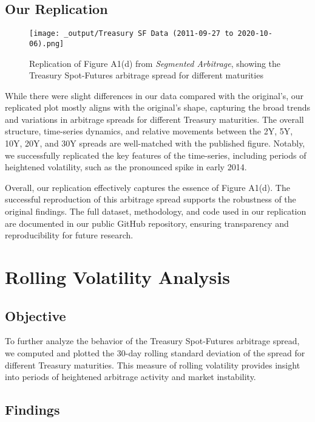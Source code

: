 \documentclass{article}
\begin{document}
\subsection{Our Replication}

\begin{figure}[h]
  \centering
  \texttt{[image: \_output/Treasury SF Data (2011-09-27 to 2020-10-06).png]}
  \caption{Replication of Figure A1(d) from \textit{Segmented Arbitrage}, showing the Treasury Spot-Futures arbitrage spread for different maturities}
  \label{fig:treasury_spot_futures_replication}
\end{figure}




While there were slight differences in our data compared with the original's, our replicated plot mostly aligns with the original's shape, capturing the broad trends and variations in arbitrage spreads for different Treasury maturities. The overall structure, time-series dynamics, and relative movements between the 2Y, 5Y, 10Y, 20Y, and 30Y spreads are well-matched with the published figure. Notably, we successfully replicated the key features of the time-series, including periods of heightened volatility, such as the pronounced spike in early 2014.

Overall, our replication effectively captures the essence of Figure A1(d). The successful reproduction of this arbitrage spread supports the robustness of the original findings. The full dataset, methodology, and code used in our replication are documented in our public GitHub repository, ensuring transparency and reproducibility for future research.


\newpage


\section{Rolling Volatility Analysis}
\subsection{Objective}

To further analyze the behavior of the Treasury Spot-Futures arbitrage spread, we computed and plotted the 30-day rolling standard deviation of the spread for different Treasury maturities. This measure of rolling volatility provides insight into periods of heightened arbitrage activity and market instability.

\subsection{Findings}
\end{document}
